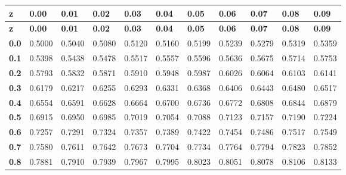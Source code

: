 \begin{longtable}{|l|l|l|l|l|l|l|l|l|l|l|}
    \hline
    \textbf{z}    & \textbf{0.00}    & \textbf{0.01}    & \textbf{0.02}    & \textbf{0.03}    & \textbf{0.04}    & \textbf{0.05}    & \textbf{0.06}    & \textbf{0.07}    & \textbf{0.08}    & \textbf{0.09}\\
    \hline\endfirsthead

    \hline
    \textbf{z}    & \textbf{0.00}    & \textbf{0.01}    & \textbf{0.02}    & \textbf{0.03}    & \textbf{0.04}    & \textbf{0.05}    & \textbf{0.06}    & \textbf{0.07}    & \textbf{0.08}    & \textbf{0.09}\\
    \hline\endhead

    \hline\endfoot
    \hline\endlastfoot
    
    
    \textbf{0.0}  & 0.5000  & 0.5040  & 0.5080  & 0.5120  & 0.5160  & 0.5199  & 0.5239  & 0.5279  & 0.5319  & 0.5359\\ \hline
    
    \textbf{0.1}  & 0.5398  & 0.5438  & 0.5478  & 0.5517  & 0.5557  & 0.5596  & 0.5636  & 0.5675  & 0.5714  & 0.5753\\ \hline
    
    \textbf{0.2}  & 0.5793  & 0.5832  & 0.5871  & 0.5910  & 0.5948  & 0.5987  & 0.6026  & 0.6064  & 0.6103  & 0.6141\\ \hline
    
    \textbf{0.3}  & 0.6179  & 0.6217  & 0.6255  & 0.6293  & 0.6331  & 0.6368  & 0.6406  & 0.6443  & 0.6480  & 0.6517\\ \hline
    
    \textbf{0.4}  & 0.6554  & 0.6591  & 0.6628  & 0.6664  & 0.6700  & 0.6736  & 0.6772  & 0.6808  & 0.6844  & 0.6879\\ \hline
    
    \textbf{0.5}  & 0.6915  & 0.6950  & 0.6985  & 0.7019  & 0.7054  & 0.7088  & 0.7123  & 0.7157  & 0.7190  & 0.7224\\ \hline
    
    \textbf{0.6}  & 0.7257  & 0.7291  & 0.7324  & 0.7357  & 0.7389  & 0.7422  & 0.7454  & 0.7486  & 0.7517  & 0.7549\\ \hline
    
    \textbf{0.7}  & 0.7580  & 0.7611  & 0.7642  & 0.7673  & 0.7704  & 0.7734  & 0.7764  & 0.7794  & 0.7823  & 0.7852\\ \hline
    
    \textbf{0.8}  & 0.7881  & 0.7910  & 0.7939  & 0.7967  & 0.7995  & 0.8023  & 0.8051  & 0.8078  & 0.8106  & 0.8133\\ \hline
    

\end{longtable}
